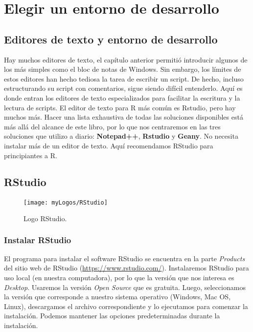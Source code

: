 \documentclass[
]{book}
\begin{document}
\hypertarget{IDE}{%
\chapter{Elegir un entorno de desarrollo}\label{IDE}}

\hypertarget{editores-de-texto-y-entorno-de-desarrollo}{%
\section{Editores de texto y entorno de desarrollo}\label{editores-de-texto-y-entorno-de-desarrollo}}

Hay muchos editores de texto, el capítulo anterior permitió introducir algunos de los más simples como el bloc de notas de Windows. Sin embargo, los límites de estos editores han hecho tediosa la tarea de escribir un script. De hecho, incluso estructurando su script con comentarios, sigue siendo difícil entenderlo. Aquí es donde entran los editores de texto especializados para facilitar la escritura y la lectura de scripts.
El editor de texto para R más común es Rstudio, pero hay muchos más. Hacer una lista exhaustiva de todas las soluciones disponibles está más allá del alcance de este libro, por lo que nos centraremos en las tres soluciones que utilizo a diario: \textbf{Notepad++}, \textbf{Rstudio} y \textbf{Geany}. No necesita instalar más de un editor de texto. Aquí recomendamos RStudio para principiantes a R.

\hypertarget{rstudio}{%
\section{RStudio}\label{rstudio}}

\begin{figure}
\texttt{[image: myLogos/RStudio]} \caption{Logo RStudio.\label{fig:logoRStudio}}\label{fig:logoRStudio}
\end{figure}

\hypertarget{instalar-rstudio}{%
\subsection{Instalar RStudio}\label{instalar-rstudio}}

El programa para instalar el software RStudio se encuentra en la parte \emph{Products} del sitio web de RStudio (\url{https://www.rstudio.com/}). Instalaremos RStudio para uso local (en nuestra computadora), por lo que la versión que nos interesa es \emph{Desktop}. Usaremos la versión \emph{Open Source} que es gratuita. Luego, seleccionamos la versión que corresponde a nuestro sistema operativo (Windows, Mac OS, Linux), descargamos el archivo correspondiente y lo ejecutamos para comenzar la instalación. Podemos mantener las opciones predeterminadas durante la instalación.
\end{document}
